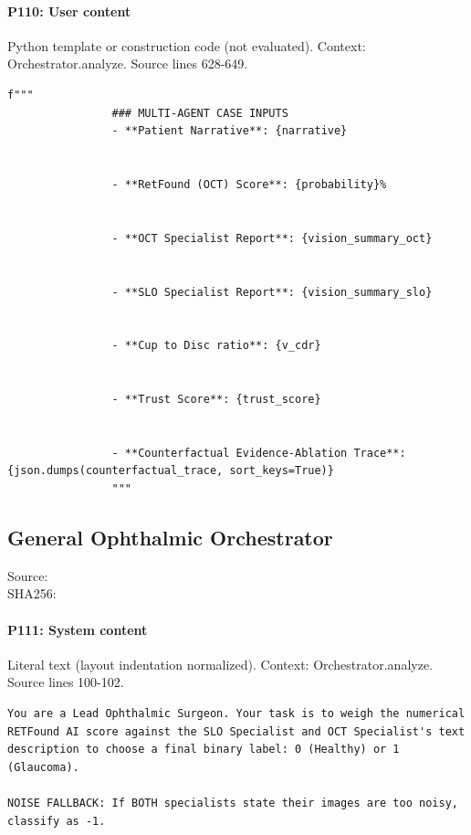 \documentclass[10pt]{article}
\begin{document}
\paragraph{P110: User content}
Python template or construction code (not evaluated). Context: Orchestrator.analyze. Source lines 628-649.
\begin{Verbatim}
f"""
                ### MULTI-AGENT CASE INPUTS
                - **Patient Narrative**: {narrative}
                
                
                - **RetFound (OCT) Score**: {probability}%
                
                
                - **OCT Specialist Report**: {vision_summary_oct}
                
                
                - **SLO Specialist Report**: {vision_summary_slo}
                
                
                - **Cup to Disc ratio**: {v_cdr}
                
                
                - **Trust Score**: {trust_score}


                - **Counterfactual Evidence-Ablation Trace**: {json.dumps(counterfactual_trace, sort_keys=True)}
                """
\end{Verbatim}
\subsection{General Ophthalmic Orchestrator}
Source: \\
SHA256: {\scriptsize{}}
\paragraph{P111: System content}
Literal text (layout indentation normalized). Context: Orchestrator.analyze. Source lines 100-102.
\begin{Verbatim}
You are a Lead Ophthalmic Surgeon. Your task is to weigh the numerical RETFound AI score against the SLO Specialist and OCT Specialist's text description to choose a final binary label: 0 (Healthy) or 1 (Glaucoma).

NOISE FALLBACK: If BOTH specialists state their images are too noisy, classify as -1.
\end{Verbatim}
\end{document}
